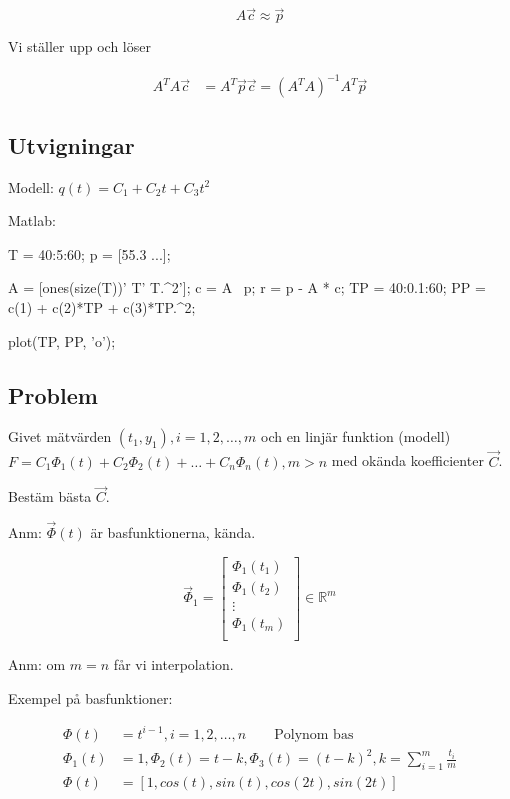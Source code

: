 \documentclass[a4paper,10pt,swedish]{memoir}
\numberwithin{equation}{subsection}
\begin{document}
\begin{equation}
A\vec{c}\approx \vec{p}
\end{equation}

Vi ställer upp och löser

\begin{align}
A^TA\vec{c}&=A^T\vec{p}
\vec{c}=(A^TA)^{-1}A^T\vec{p}
\end{align}

\subsection{Utvigningar}

Modell: $q(t) = C_1 + C_2 t + C_3 t^2$

Matlab:

\begin{matlabcode}
T = 40:5:60;
p = [55.3 ...];

A = [ones(size(T))' T' T.^2'];
c = A \ p;
r = p - A * c;
TP = 40:0.1:60;
PP = c(1) + c(2)*TP + c(3)*TP.^2;

plot(TP, PP, 'o');
\end{matlabcode}

\subsection{Problem}

Givet mätvärden $(t_1, y_1), i=1,2,\ldots,m$ och en linjär funktion
(modell) $F=C_1 \Phi_1(t) + C_2\Phi_2(t) + \ldots + C_n\Phi_n(t), m >
n$ med okända koefficienter $\vec{C}$.

Bestäm bästa $\vec{C}$.

Anm: $\vec{\Phi}(t)$ är basfunktionerna, kända.

\begin{equation}
\vec{\Phi}_1 = \left[\begin{array}{c}
\Phi_1(t_1) \\
\Phi_1(t_2) \\
\vdots \\
\Phi_1(t_m) \\
\end{array}\right] \in \mathbb{R}^m
\end{equation}

Anm: om $m=n$ får vi interpolation.

Exempel på basfunktioner:

\begin{align}
\Phi(t) &= t^{i-1}, i = 1,2,\ldots,n \qquad \text{Polynom bas} \\
\Phi_1(t) &= 1, \Phi_2(t) = t-k, \Phi_3(t) = (t-k)^2, k = \sum_{i=1}^{m}\frac{t_i}{m} \\
\Phi(t) &= \left[1, cos(t), sin(t), cos(2t), sin(2t)\right]
\end{align}
\end{document}
